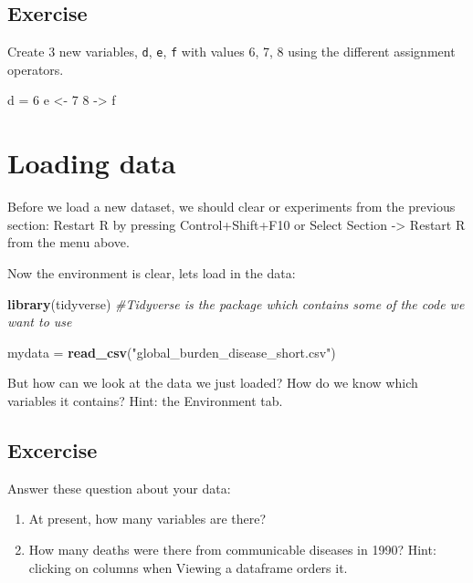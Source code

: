 \documentclass[]{book}
\makeatletter
\newenvironment{Shaded}{\begin{snugshade}}{\end{snugshade}}
\newcommand{\KeywordTok}[1]{\textcolor[rgb]{0.13,0.29,0.53}{\textbf{#1}}}
\newcommand{\DecValTok}[1]{\textcolor[rgb]{0.00,0.00,0.81}{#1}}
\newcommand{\StringTok}[1]{\textcolor[rgb]{0.31,0.60,0.02}{#1}}
\newcommand{\CommentTok}[1]{\textcolor[rgb]{0.56,0.35,0.01}{\textit{#1}}}
\newcommand{\NormalTok}[1]{#1}
\newenvironment{kframe}{%
\medskip{}
\setlength{\fboxsep}{.8em}
 \def\at@end@of@kframe{}%
 \ifinner\ifhmode%
  \def\at@end@of@kframe{\end{minipage}}%
  \begin{minipage}{\columnwidth}%
 \fi\fi%
 \def\FrameCommand##1{\hskip\@totalleftmargin \hskip-\fboxsep
 \colorbox{shadecolor}{##1}\hskip-\fboxsep
     \hskip-\linewidth \hskip-\@totalleftmargin \hskip\columnwidth}%
 \MakeFramed {\advance\hsize-\width
   \@totalleftmargin\z@ \linewidth\hsize
   \@setminipage}}%
 {\par\unskip\endMakeFramed%
 \at@end@of@kframe}
\renewenvironment{Shaded}{\begin{kframe}}{\end{kframe}}
\theoremstyle{definition}
\theoremstyle{definition}
\theoremstyle{definition}
\theoremstyle{remark}
\makeatother
\begin{document}
\subsection{Exercise}\label{exercise-3}

Create 3 new variables, \texttt{d}, \texttt{e}, \texttt{f} with values
6, 7, 8 using the different assignment operators.

\begin{Shaded}
\begin{Highlighting}[]
\NormalTok{d  =}\StringTok{ }\DecValTok{6}
\NormalTok{e <-}\StringTok{ }\DecValTok{7}
\DecValTok{8}\NormalTok{ ->}\StringTok{ }\NormalTok{f}
\end{Highlighting}
\end{Shaded}

\section{Loading data}\label{loading-data}

Before we load a new dataset, we should clear or experiments from the
previous section: Restart R by pressing Control+Shift+F10 or Select
Section -\textgreater{} Restart R from the menu above.

Now the environment is clear, lets load in the data:

\begin{Shaded}
\begin{Highlighting}[]
\KeywordTok{library}\NormalTok{(tidyverse) }\CommentTok{#Tidyverse is the package which contains some of the code we want to use}

\NormalTok{mydata =}\StringTok{ }\KeywordTok{read_csv}\NormalTok{(}\StringTok{"global_burden_disease_short.csv"}\NormalTok{)}
\end{Highlighting}
\end{Shaded}

But how can we look at the data we just loaded? How do we know which
variables it contains? Hint: the Environment tab.

\subsection{Excercise}\label{excercise}

Answer these question about your data:

\begin{enumerate}
\def\labelenumi{\arabic{enumi}.}
\item
  At present, how many variables are there?
\item
  How many deaths were there from communicable diseases in 1990? Hint:
  clicking on columns when Viewing a dataframe orders it.
\end{enumerate}
\end{document}
